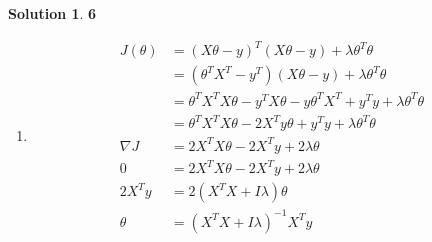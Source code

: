 \documentclass[11pt]{article}
\theoremstyle{definition}
\theoremstyle{nopunct}
\newtheorem*{s}{Solution}
\begin{document}
\begin{s}\textbf{6}
    \begin{enumerate}
        \item
            \begin{align*}
                J(\theta) &= (X\theta - y)^T(X\theta - y) + \lambda \theta^T\theta \\
                          &= (\theta^TX^T - y^T)(X\theta - y) + \lambda \theta^T\theta \\
                          &= \theta^TX^TX\theta - y^TX\theta - y \theta^TX^T + y^Ty+ \lambda \theta^T\theta \\
                          &= \theta^TX^TX\theta - 2X^Ty\theta + y^Ty+ \lambda \theta^T\theta \\
                \nabla J &= 2X^TX\theta - 2X^Ty + 2\lambda\theta \\
                        0 &= 2X^TX\theta - 2X^Ty + 2\lambda\theta \\
                        2X^Ty &= 2(X^TX + I\lambda)\theta \\
                        \theta &= (X^TX + I\lambda)^{-1}X^Ty
            \end{align*}


\end{enumerate}
\end{s}
\end{document}
